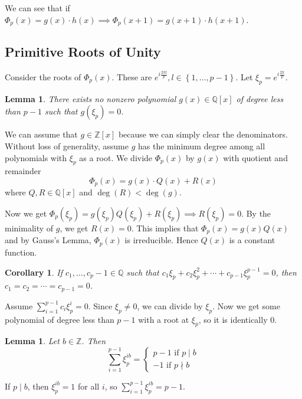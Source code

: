 \documentclass[11pt]{article}
\newtheorem{cor}{Corollary}[thm]
\newtheorem{lemma}[thm]{Lemma}
\theoremstyle{definition}
\newcommand{\set}[1]{\left\{ #1 \right\}}
\newcommand{\rng}[2]{#1,\dots,#2}
\newcommand{\srng}[3]{#1_#2,\dots,#1_#3}
\newcommand{\QQ}{\mathbb{Q}}
\newcommand{\ZZ}{\mathbb{Z}}
\begin{document}
	We can see that if $\Phi_p(x) = g(x) \cdot h(x) \implies \Phi_p(x+1) = g(x+1) \cdot h(x+1)$. 
\qedhere

\subsection{Primitive Roots of Unity}

Consider the roots of $\Phi_p(x)$. These are $ e^{i\frac{2\pi l}{p}}, l\in\set{\rng{1}{p-1}} . $
Let $\xi_p = e^{i\frac{2\pi}{p}}$. 
\begin{lemma}
	There exists no nonzero polynomial $g(x) \in \QQ[x]$ of degree less than $p-1$ such that $g(\xi_p) = 0$. 
\end{lemma}
\proof
	We can assume that $g\in\ZZ[x]$ because we can simply clear the denominators. 
	Without loss of generality, assume $g$ has the minimum degree among all polynomials with $\xi_p$ as a root.
	We divide $\Phi_p(x)$ by $g(x)$ with quotient and remainder
	$$ \Phi_p(x) = g(x) \cdot Q(x) + R(x) $$
	where $Q,R\in\QQ[x]$ and $\deg(R) < \deg(g)$. 

	Now we get $\Phi_p(\xi_p) = g(\xi_p) Q(\xi_p) + R(\xi_p) \implies R(\xi_p) = 0$. 
	By the minimality of $g$, we get $R(x) = 0$. 
	This implies that $\Phi_p(x) = g(x)Q(x)$ and by Gauss's Lemma, $\Phi_p(x)$ is irreducible. 
	Hence $Q(x)$ is a constant function.
\qedhere
\begin{cor}
	If $\srng{c}{1}{p-1} \in\QQ$ such that $c_1\xi_p + c_2\xi_p^2 + \cdots + c_{p-1}\xi_p^{p-1} = 0$, then $c_1 = c_2 = \cdots = c_{p-1} = 0$. 
\end{cor}
\proof
	Assume $\sum_{i=1}^{p-1} c_i \xi_p^i = 0$. Since $\xi_p \neq 0$, we can divide by $\xi_p$. 
	Now we get some polynomial of degree less than $p-1$ with a root at $\xi_p$, so it is identically $0$. 
\qedhere


\begin{lemma}
	Let $b\in\ZZ$. Then 
	\[
		\sum_{i=1}^{p-1} \xi_p^{ib} = 
		\begin{cases}
			p-1 \text{ if } p\mid b \\
			-1 \text{ if } p\nmid b
		\end{cases}
	\]
\end{lemma}
\proof 
	If $p\mid b$, then $\xi_p^{ib} = 1$ for all $i$, so $\sum_{i=1}^{p-1} \xi_p^{ib} = p-1$. 
\end{document}
